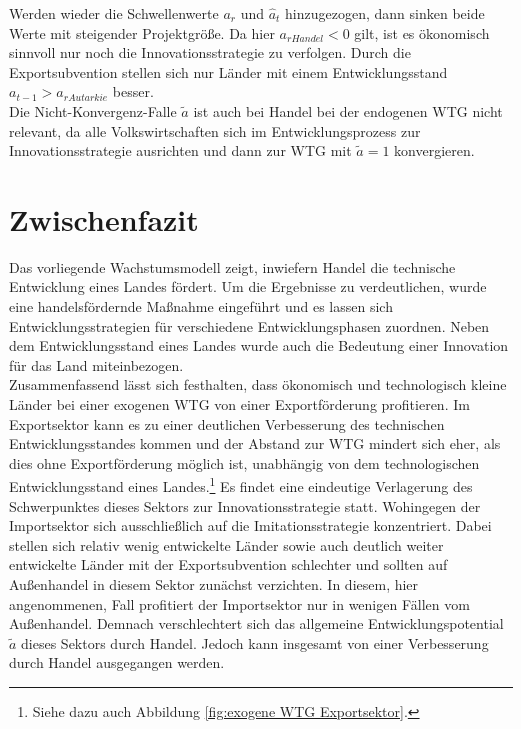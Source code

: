 Werden wieder die Schwellenwerte $a_r$ und $\hat{a}_t$ hinzugezogen, dann sinken beide Werte mit steigender Projektgrö{\ss}e. Da hier $a_{rHandel}<0$ gilt, ist es ökonomisch sinnvoll nur noch die \textcolor[rgb]{0.74,0.97,0.22}{Innovationsstrategie} zu verfolgen. Durch die Exportsubvention stellen sich nur Länder mit einem Entwicklungsstand $a_{t-1}>a_{rAutarkie}$ besser.\\


Die Nicht-Konvergenz-Falle $\tilde{a}$ ist auch bei Handel bei der endogenen WTG nicht relevant, da alle Volkswirtschaften sich im Entwicklungsprozess zur Innovationsstrategie ausrichten und dann zur WTG mit $\tilde{a}=1$ konvergieren. 


\section{Zwischenfazit}
Das vorliegende Wachstumsmodell zeigt, inwiefern  Handel die technische Entwicklung eines Landes fördert. Um die Ergebnisse zu verdeutlichen, wurde eine handelsfördernde Ma{\ss}nahme eingeführt und es lassen sich Entwicklungsstrategien für verschiedene Entwicklungsphasen zuordnen. Neben dem Entwicklungsstand eines Landes wurde auch die Bedeutung einer Innovation für das Land miteinbezogen.\\
Zusammenfassend lässt sich festhalten, dass ökonomisch und technologisch kleine Länder bei einer exogenen WTG von einer Exportförderung profitieren. Im Exportsektor kann es zu einer deutlichen Verbesserung des technischen Entwicklungsstandes kommen und der Abstand zur WTG mindert sich eher, als dies ohne Exportförderung möglich ist, unabhängig von dem technologischen Entwicklungsstand eines Landes.\footnote{Siehe dazu auch Abbildung \ref{fig:exogene WTG Exportsektor}.} Es findet eine eindeutige Verlagerung des Schwerpunktes dieses Sektors zur Innovationsstrategie statt. Wohingegen der Importsektor sich ausschlie{\ss}lich auf die Imitationsstrategie konzentriert. Dabei stellen sich relativ wenig entwickelte Länder sowie auch deutlich weiter entwickelte Länder mit der Exportsubvention schlechter und sollten auf Au{\ss}enhandel in diesem Sektor zunächst verzichten. In diesem, hier angenommenen, Fall profitiert der Importsektor nur in wenigen Fällen vom Au{\ss}enhandel. Demnach verschlechtert sich das allgemeine Entwicklungspotential $\tilde{a}$ dieses Sektors durch Handel. Jedoch kann insgesamt von einer Verbesserung durch Handel ausgegangen werden.\\


